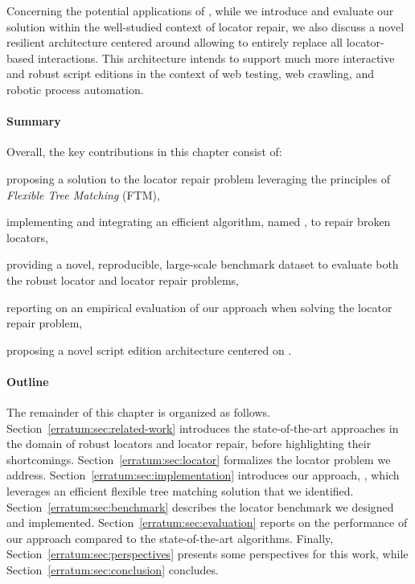 Concerning the potential applications of \erratum, while we introduce and evaluate our solution within the well-studied context of locator repair, we also discuss a novel resilient architecture centered around \erratum allowing to entirely replace all locator-based interactions.
This architecture intends to support much more interactive and robust script editions in the context of web testing, web crawling, and robotic process automation.

\paragraph{Summary}
Overall, the key contributions in this chapter consist of:
\begin{compactenum}
    \item proposing a solution to the locator repair problem leveraging the principles of \emph{Flexible Tree Matching} (FTM),
    \item implementing and integrating an efficient algorithm, named \erratum, to repair broken locators,
    \item providing a novel, reproducible, large-scale benchmark dataset to evaluate both the robust locator and locator repair problems,
    \item reporting on an empirical evaluation of our approach when solving the locator repair problem,
    \item proposing a novel script edition architecture centered on \erratum.
\end{compactenum}

\paragraph{Outline}
The remainder of this chapter is organized as follows.
Section~\ref{erratum:sec:related-work} introduces the state-of-the-art approaches in the domain of robust locators and locator repair, before highlighting their shortcomings.
Section~\ref{erratum:sec:locator} formalizes the locator problem we address.
Section~\ref{erratum:sec:implementation} introduces our approach, \erratum, which leverages an efficient flexible tree matching solution that we identified.
Section~\ref{erratum:sec:benchmark} describes the locator benchmark we designed and implemented.
Section~\ref{erratum:sec:evaluation} reports on the performance of our approach compared to the state-of-the-art algorithms.
Finally, Section~\ref{erratum:sec:perspectives} presents some perspectives for this work, while Section~\ref{erratum:sec:conclusion} concludes.

